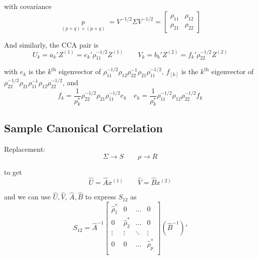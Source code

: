     with covariance
    \begin{equation}
        \mathop{\rho  }\limits_{(p+q)\times (p+q)}=V^{-1/2}\Sigma V^{-1/2}=\begin{bmatrix}
            \rho _{11}&\rho _{12}\\
            \rho _{21}&\rho _{22}
        \end{bmatrix}
    \end{equation}

    And similarly, the CCA pair is
    \begin{equation}
        U_k=a_k'Z^{(1)}=e_k'\rho _{11}^{-1/2}Z^{(1)}\qquad V_{k}=b_k'Z^{(2)}=f_k'\rho _{22}^{-1/2}Z^{(2)}
    \end{equation}
    
    with $ e_k $ is the $ k^\mathrm{th} $ eigenvector of $ \rho _11 ^{-1/2}\rho _{12}\rho _{22}^{-1}\rho_{21}\rho _{11}^{-1/2} $, $ f_[k] $ is the $ k^\mathrm{th} $ eigenvector of $ \rho _{22}^{-1/2}\rho _{21}\rho _{11}^{-1}\rho _{12}\rho _{22}^{-1/2} $, and
    \begin{equation}
        f_k=\dfrac{1}{\rho ^*_k}\rho _{22}^{-1/2}\rho _{21}\rho _{11}^{-1/2}e_k\quad e_k=\dfrac{1}{\rho _k^*}\rho _{11}^{-1/2}\rho _{12}\rho _{22}^{-1/2}f_k
    \end{equation}
    
    
\subsection{Sample Canonical Correlation}
    Replacement:
    \begin{equation}
        \Sigma \longrightarrow S\qquad \rho \longrightarrow R 
    \end{equation}
    
    to get 
    \begin{equation}
        \hat{U}=\hat{A}x^{(1)}\qquad \hat{V}=\hat{B}x^{(2)} 
    \end{equation}

    and we can use $ \hat{U},\hat{V},\, \hat{A},\hat{B} $ to express $ S_{12} $ as
    \begin{equation}
        S_{12}=\hat{A}^{-1}\begin{bmatrix}
        \hat{\rho }^*_{1}&0&\ldots&0\\
        0&\hat{\rho }^*_{2}&\ldots&0\\
        \vdots&\vdots&\ddots&\vdots\\
        0&0&\ldots&\hat{\rho }^*_{p}\\
        \end{bmatrix}(\hat{B}^{-1})'
    \end{equation}
    
